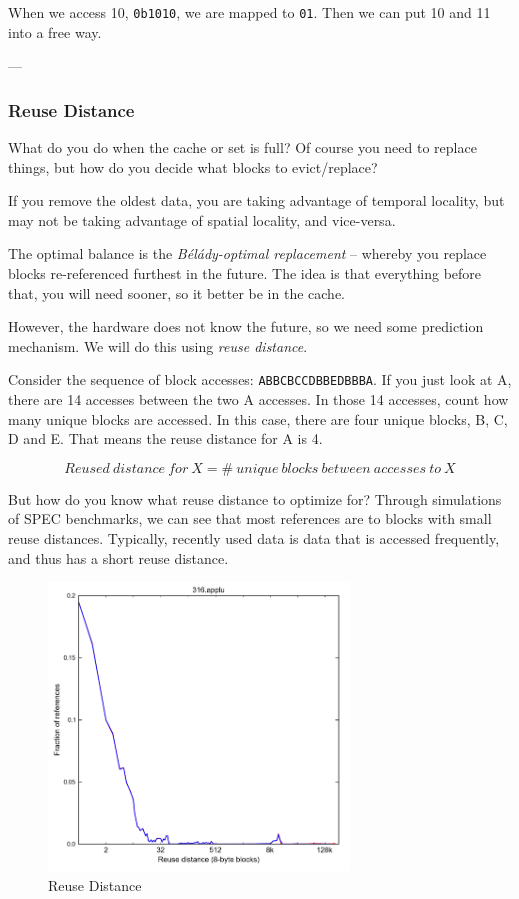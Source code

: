 \documentclass{article}
\newcommand{\myequations}[1]{
   \addcontentsline{equ}{myequations}{\protect\numberline{\theequation}#1}
}
\begin{document}
When we access 10, \texttt{0b1010}, we are mapped to \texttt{01}. Then we can put 10 and 11 into a free way. 

---


\subsubsection{Reuse Distance}

What do you do when the cache or set is full? Of course you need to replace things, but how do you decide what blocks to evict/replace?

If you remove the oldest data, you are taking advantage of temporal locality, but may not be taking advantage of spatial locality, and vice-versa. 

The optimal balance is the \textit{B\'{e}l\'{a}dy-optimal replacement} -- whereby you replace blocks re-referenced furthest in the future. The idea is that everything before that, you will need sooner, so it better be in the cache. 

However, the hardware does not know the future, so we need some prediction mechanism. We will do this using \textit{reuse distance}.

Consider the sequence of block accesses: \texttt{ABBCBCCDBBEDBBBA}. If you just look at A, there are 14 accesses between the two A accesses. In those 14 accesses, count how many unique blocks are accessed. In this case, there are four unique blocks, B, C, D and E. That means the reuse distance for A is 4.

\begin{equation}
Reused\ distance\ for\ X = \#\ unique\ blocks\ between\ accesses\ to\  X
\end{equation}
\myequations{Reuse distance}

But how do you know what reuse distance to optimize for? Through simulations of SPEC benchmarks, we can see that most references are to blocks with small reuse distances. Typically, recently used data is data that is accessed frequently, and thus has a short reuse distance. 

\begin{figure}[ht!]
\centering
\includegraphics[width=80mm]{img/reuse.png}
\caption{Reuse Distance}
\end{figure}
\end{document}
